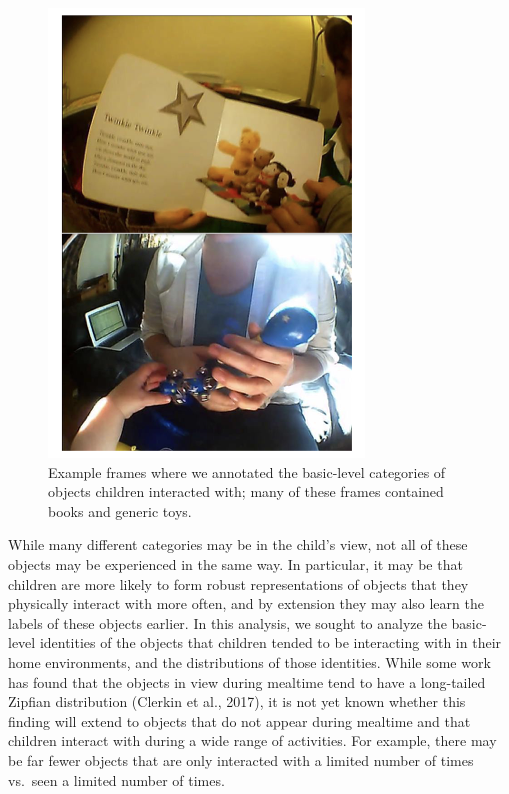 \documentclass[10pt, letterpaper]{article}
\newenvironment{CodeChunk}{}{}
\begin{document}
\begin{CodeChunk}
\begin{figure}[h]

{\centering \includegraphics[width=0.75\linewidth]{figs/basic_levelexamples-1} 

}

\caption[Example frames where we annotated the basic-level categories of objects children interacted with]{Example frames where we annotated the basic-level categories of objects children interacted with; many of these frames contained books and generic toys.}\label{fig:basic_levelexamples}
\end{figure}
\end{CodeChunk}

While many different categories may be in the child's view, not all of
these objects may be experienced in the same way. In particular, it may
be that children are more likely to form robust representations of
objects that they physically interact with more often, and by extension
they may also learn the labels of these objects earlier. In this
analysis, we sought to analyze the basic-level identities of the objects
that children tended to be interacting with in their home environments,
and the distributions of those identities. While some work has found
that the objects in view during mealtime tend to have a long-tailed
Zipfian distribution (Clerkin et al., 2017), it is not yet known whether
this finding will extend to objects that do not appear during mealtime
and that children interact with during a wide range of activities. For
example, there may be far fewer objects that are only interacted with a
limited number of times vs.~seen a limited number of times.
\end{document}
